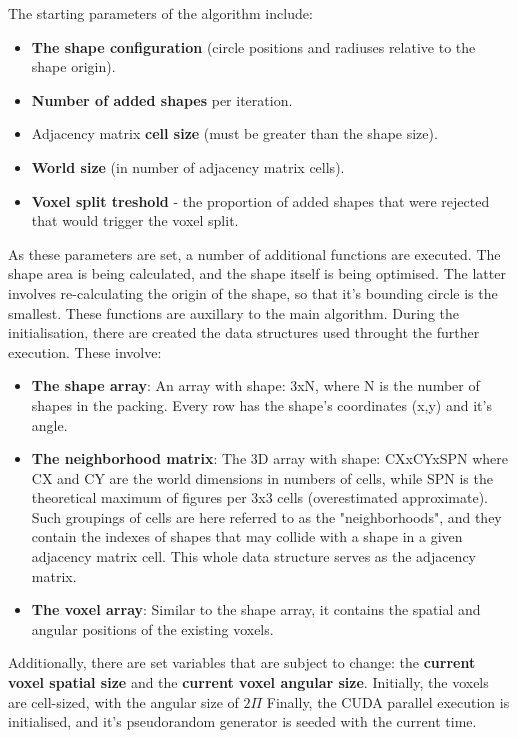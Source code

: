 \documentclass[12pt, oneside]{report}
\begin{document}
The starting parameters of the algorithm include:
\begin{itemize}
  \item \textbf{The shape configuration} (circle positions and radiuses relative to the shape origin).
  \item \textbf{Number of added shapes} per iteration.
  \item Adjacency matrix \textbf{cell size} (must be greater than the shape size).
  \item \textbf{World size} (in number of adjacency matrix cells).
	\item \textbf{Voxel split treshold} - the proportion of added shapes that were rejected that would trigger the voxel split.
\end{itemize}
As these parameters are set, a number of additional functions are executed. The shape area is being calculated, and the shape itself is being optimised. The latter involves re-calculating the origin of the shape, so that it's bounding circle is the smallest. These functions are auxillary to the main algorithm.
\newline
During the initialisation, there are created the data structures used throught the further execution. These involve:
\begin{itemize}
  \item \textbf{The shape array}: An array with shape: 3xN, where N is the number of shapes in the packing. Every row has the shape's coordinates (x,y) and it's angle.
  \item \textbf{The neighborhood matrix}: The 3D array with shape: CXxCYxSPN where CX and CY are the world dimensions in numbers of cells, while SPN is the theoretical maximum of figures per 3x3 cells (overestimated approximate). Such groupings of cells are here referred to as the "neighborhoods", and they contain the indexes of shapes that may collide with a shape in a given adjacency matrix cell. This whole data structure serves as the adjacency matrix.
  \item \textbf{The voxel array}: Similar to the shape array, it contains the spatial and angular positions of the existing voxels.
\end{itemize}
Additionally, there are set variables that are subject to change: the \textbf{current voxel spatial size} and the \textbf{current voxel angular size}. Initially, the voxels are cell-sized, with the angular size of $2 \Pi$
Finally, the CUDA parallel execution is initialised, and it's pseudorandom generator is seeded with the current time.
\end{document}
